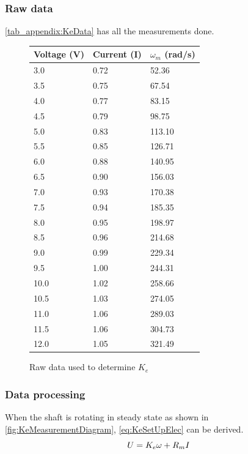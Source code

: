 \subsubsection*{Raw data}
\autoref{tab_appendix:KeData} has all the measurements done.
\begin{figure}[htbp]
	\centering
	\caption{Raw data used to determine $K_e$}\label{tab_appendix:KeData}
	\begin{tabularx}{0.5\textwidth}{lXX}
		Voltage (V) & Current (I) & $\omega_m$ (rad/s)\\ \toprule \rowcolor{lightGrey}
		3.0  & 0.72 & 52.36  \\
		3.5  & 0.75 & 67.54  \\ \rowcolor{lightGrey}
		4.0  & 0.77 & 83.15  \\
		4.5  & 0.79 & 98.75  \\ \rowcolor{lightGrey}
		5.0  & 0.83 & 113.10 \\
		5.5  & 0.85 & 126.71 \\ \rowcolor{lightGrey}
		6.0  & 0.88 & 140.95 \\
		6.5  & 0.90 & 156.03 \\ \rowcolor{lightGrey}
		7.0  & 0.93 & 170.38 \\
		7.5  & 0.94 & 185.35 \\ \rowcolor{lightGrey}
		8.0  & 0.95 & 198.97 \\
		8.5  & 0.96 & 214.68 \\ \rowcolor{lightGrey}
		9.0  & 0.99 & 229.34 \\
		9.5  & 1.00 & 244.31 \\ \rowcolor{lightGrey}
		10.0 & 1.02 & 258.66 \\
		10.5 & 1.03 & 274.05 \\ \rowcolor{lightGrey}
		11.0 & 1.06 & 289.03 \\
		11.5 & 1.06 & 304.73 \\ \rowcolor{lightGrey}
		12.0 & 1.05 & 321.49
	\end{tabularx}
\end{figure}



\subsubsection*{Data processing}

When the shaft is rotating in steady state as shown in \autoref{fig:KeMeasurementDiagram}, \autoref{eq:KeSetUpElec} can be derived.
\begin{equation}
U=K_e\omega+R_m I \addunit{\volt}
\label{eq:KeSetUpElec}
\end{equation}

